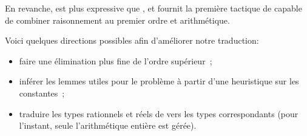 En revanche, \beagletac est plus expressive que \metistac, et fournit la
première tactique de \holfour capable de combiner raisonnement au premier
ordre et arithmétique.

Voici quelques directions possibles afin d'améliorer notre traduction:
\begin{itemize}
\item faire une élimination plus fine de l'ordre supérieur~\cite{Bohme12};
\item inférer les lemmes utiles pour le problème à partir d'une
  heuristique sur les constantes~\cite{Paulson10};
\item traduire les types rationnels et réels de \holfour vers les types
  \tff correspondants (pour l'instant, seule l'arithmétique entière est
  gérée).
\end{itemize}

